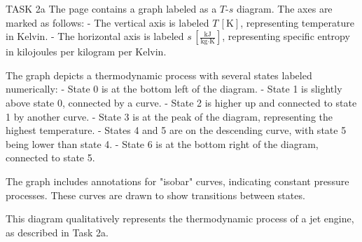 TASK 2a  
The page contains a graph labeled as a \( T \)-\( s \) diagram. The axes are marked as follows:  
- The vertical axis is labeled \( T \, [\text{K}] \), representing temperature in Kelvin.  
- The horizontal axis is labeled \( s \, [\frac{\text{kJ}}{\text{kg·K}}] \), representing specific entropy in kilojoules per kilogram per Kelvin.  

The graph depicts a thermodynamic process with several states labeled numerically:  
- State 0 is at the bottom left of the diagram.  
- State 1 is slightly above state 0, connected by a curve.  
- State 2 is higher up and connected to state 1 by another curve.  
- State 3 is at the peak of the diagram, representing the highest temperature.  
- States 4 and 5 are on the descending curve, with state 5 being lower than state 4.  
- State 6 is at the bottom right of the diagram, connected to state 5.  

The graph includes annotations for "isobar" curves, indicating constant pressure processes. These curves are drawn to show transitions between states.  

This diagram qualitatively represents the thermodynamic process of a jet engine, as described in Task 2a.